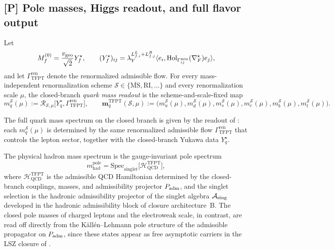 \subsection{[P] Pole masses, Higgs readout, and full flavor output}

\begin{definition}
\label{def:scheme-fixed-yukawa-kernel}
Let
\[
M_f^{(0)}=\frac{v_{\mathrm{geo}}}{\sqrt2}Y_f^\star,
\qquad
(Y_f^\star)_{ij}
=
\lambda_Y^{L_{f,i}^L+L_{f,j}^R}
\langle e_i,\mathrm{Hol}_{\Gamma_{ij}^{\min}}(\nabla_F^\star)e_j\rangle,
\]
and let $\Gamma_{\mathrm{TFPT}}^{\mathrm{ren}}$ denote the renormalized admissible flow. For every
mass-independent renormalization scheme $\mathcal S\in\{\overline{\mathrm{MS}},\mathrm{RI},\dots\}$
and every renormalization scale $\mu$, the closed-branch \emph{quark mass readout} is the
scheme-and-scale-fixed map
\[
m_q^{\mathcal S}(\mu)
:=
\mathcal R_{\mathcal S,\mu}\bigl[Y_q^\star,\Gamma_{\mathrm{TFPT}}^{\mathrm{ren}}\bigr],
\qquad
\mathbf m_q^{\mathrm{TFPT}}(\mathcal S,\mu)
:=
\bigl(m_u^{\mathcal S}(\mu),m_d^{\mathcal S}(\mu),m_s^{\mathcal S}(\mu),
m_c^{\mathcal S}(\mu),m_b^{\mathcal S}(\mu),m_t^{\mathcal S}(\mu)\bigr).
\]
\end{definition}

\begin{conjecture}
\label{thm:closed_pole_mass_completion}
The full quark mass spectrum on the closed branch is given by the readout of
: each $m_q^{\mathcal S}(\mu)$ is determined by the same
renormalized admissible flow $\Gamma_{\mathrm{TFPT}}^{\mathrm{ren}}$ that controls the lepton sector,
together with the closed-branch Yukawa data $Y_q^\star$.
\end{conjecture}

\begin{conjecture}
\label{thm:hadron_pole_masses_singlet_spectrum}
The physical hadron mass spectrum is the gauge-invariant pole spectrum
\[
m_{\mathrm{had}}^{\mathrm{pole}}
=
\mathrm{Spec}_{\mathrm{singlet}}
\bigl[\mathcal H_{\mathrm{QCD}}^{\mathrm{TFPT}}\bigr],
\]
where $\mathcal H_{\mathrm{QCD}}^{\mathrm{TFPT}}$ is the admissible QCD Hamiltonian determined by the
closed-branch couplings, masses, and admissibility projector $P_{\mathrm{adm}}$, and the singlet selection is
the hadronic admissibility projector of the singlet algebra $\mathcal A_{\mathrm{sing}}$ developed in the hadronic
admissibility block of closure architecture~B. The closed pole
masses of charged leptons and the electroweak scale, in contrast, are read off directly from the
Källén--Lehmann pole structure of the admissible propagator on $P_{\mathrm{adm}}$, since these states appear as
free asymptotic carriers in the LSZ closure of .
\end{conjecture}

